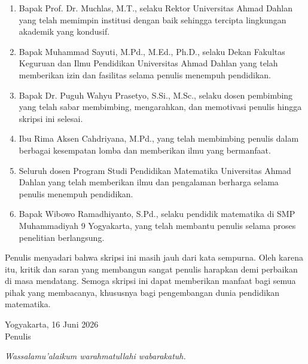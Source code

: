 \begin{enumerate}
    \item Bapak Prof. Dr. Muchlas, M.T., selaku Rektor Universitas Ahmad Dahlan yang telah memimpin institusi dengan baik sehingga tercipta lingkungan akademik yang kondusif.
    
    \item Bapak Muhammad Sayuti, M.Pd., M.Ed., Ph.D., selaku Dekan Fakultas Keguruan dan Ilmu Pendidikan Universitas Ahmad Dahlan yang telah memberikan izin dan fasilitas selama penulis menempuh pendidikan.

    
    \item Bapak Dr. Puguh Wahyu Prasetyo, S.Si., M.Sc., selaku dosen pembimbing yang telah sabar membimbing, mengarahkan, dan memotivasi penulis hingga skripsi ini selesai.
    
    \item Ibu Rima Aksen Cahdriyana, M.Pd., yang telah membimbing penulis dalam berbagai kesempatan lomba dan memberikan ilmu yang bermanfaat.
    
    \item Seluruh dosen Program Studi Pendidikan Matematika Universitas Ahmad Dahlan yang telah memberikan ilmu dan pengalaman berharga selama penulis menempuh pendidikan.
    
    \item Bapak Wibowo Ramadhiyanto, S.Pd., selaku pendidik matematika di SMP Muhammadiyah 9 Yogyakarta, yang telah membantu penulis selama proses penelitian berlangsung.
    
\end{enumerate}

\hspace*{1cm}Penulis menyadari bahwa skripsi ini masih jauh dari kata sempurna. Oleh karena itu, kritik dan saran yang membangun sangat penulis harapkan demi perbaikan di masa mendatang. Semoga skripsi ini dapat memberikan manfaat bagi semua pihak yang membacanya, khususnya bagi pengembangan dunia pendidikan matematika.

\vspace{0.5cm}

\begin{flushright}
    \begin{minipage}{0.4\textwidth}
        \centering
        Yogyakarta, 16 Juni 2026 \\
        Penulis
    \end{minipage}
\end{flushright}

\vspace{0.5cm}

\begin{center}
    \textit{Wassalamu'alaikum warahmatullahi wabarakatuh.}
\end{center}